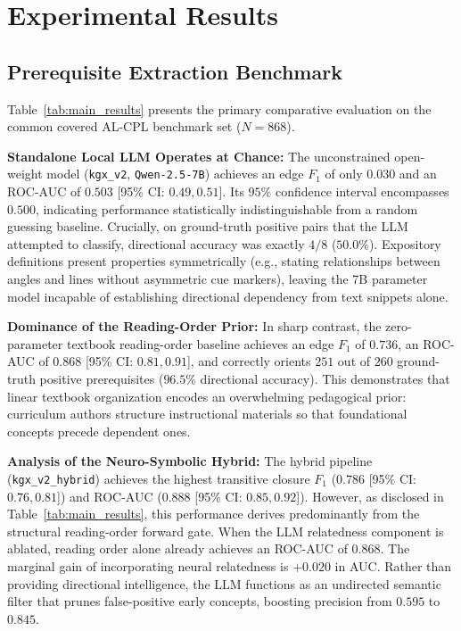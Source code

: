 \section{Experimental Results}
\label{sec:results}

\subsection{Prerequisite Extraction Benchmark}
Table~\ref{tab:main_results} presents the primary comparative evaluation on the common covered AL-CPL benchmark set ($N=868$).



\textbf{Standalone Local LLM Operates at Chance:} The unconstrained open-weight model (\texttt{kgx\_v2}, \texttt{Qwen-2.5-7B}) achieves an edge $F_1$ of only $0.030$ and an ROC-AUC of $0.503$ [95\% CI: $0.49, 0.51$]. Its $95\%$ confidence interval encompasses $0.500$, indicating performance statistically indistinguishable from a random guessing baseline. Crucially, on ground-truth positive pairs that the LLM attempted to classify, directional accuracy was exactly $4/8$ ($50.0\%$). Expository definitions present properties symmetrically (e.g., stating relationships between angles and lines without asymmetric cue markers), leaving the 7B parameter model incapable of establishing directional dependency from text snippets alone.

\textbf{Dominance of the Reading-Order Prior:} In sharp contrast, the zero-parameter textbook reading-order baseline achieves an edge $F_1$ of $0.736$, an ROC-AUC of $0.868$ [95\% CI: $0.81, 0.91$], and correctly orients $251$ out of $260$ ground-truth positive prerequisites ($96.5\%$ directional accuracy). This demonstrates that linear textbook organization encodes an overwhelming pedagogical prior: curriculum authors structure instructional materials so that foundational concepts precede dependent ones.

\textbf{Analysis of the Neuro-Symbolic Hybrid:} The hybrid pipeline (\texttt{kgx\_v2\_hybrid}) achieves the highest transitive closure $F_1$ ($0.786$ [95\% CI: $0.76, 0.81$]) and ROC-AUC ($0.888$ [95\% CI: $0.85, 0.92$]). However, as disclosed in Table~\ref{tab:main_results}, this performance derives predominantly from the structural reading-order forward gate. When the LLM relatedness component is ablated, reading order alone already achieves an ROC-AUC of $0.868$. The marginal gain of incorporating neural relatedness is $+0.020$ in AUC. Rather than providing directional intelligence, the LLM functions as an undirected semantic filter that prunes false-positive early concepts, boosting precision from $0.595$ to $0.845$.

